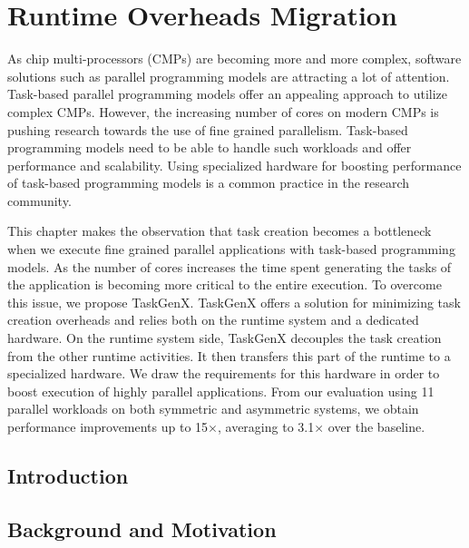 \newcommand{\proposal}{TaskGenX}
\chapter{Runtime Overheads Migration}
\label{chapter.taskgenx}
As chip multi-processors (CMPs) are becoming more and more complex, software solutions such as parallel programming models are attracting a lot of attention.
Task-based parallel programming models offer an appealing approach to utilize complex CMPs.
However, the increasing number of cores on modern CMPs is pushing research towards the use of fine grained parallelism.
Task-based programming models need to be able to handle such workloads and offer performance and scalability.
Using specialized hardware for boosting performance of task-based programming models is a common practice in the research community.

This chapter makes the observation that task creation becomes a bottleneck when we execute fine grained parallel applications with task-based programming models.
As the number of cores increases the time spent generating the tasks of the application is becoming more critical to the entire execution.
To overcome this issue, we propose {\proposal}.
{\proposal} offers a solution for minimizing task creation overheads and relies both on the runtime system and a dedicated hardware.
On the runtime system side, {\proposal} decouples the task creation from the other runtime activities.
It then transfers this part of the runtime to a specialized hardware.
We draw the requirements for this hardware in order to boost execution of highly parallel applications.
From our evaluation using 11 parallel workloads on both symmetric and asymmetric systems, we obtain performance improvements up to 15$\times$, averaging to 3.1$\times$ over the baseline.
\newpage

\section{Introduction}
\label{sec:intro}



\section{Background and Motivation}
\label{sec.taskgenx.background}


